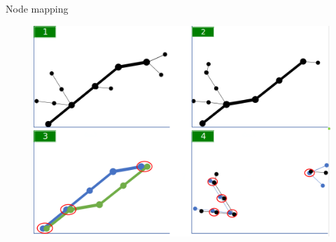 \documentclass[14pt]{beamer}
\begin{document}
\begin{frame}{Node mapping}
\begin{figure}[hbtp]
\includegraphics[scale=0.225]{node_mapping.png}
\end{figure}
\end{frame}
\end{document}
